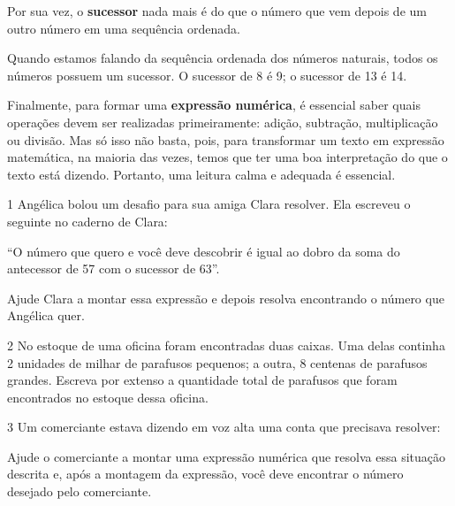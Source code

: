 {{Por sua vez, o \textbf{sucessor} nada mais é do que o número que
vem depois de um outro número em uma sequência ordenada.

Quando estamos falando da sequência ordenada dos números naturais, todos
os números possuem um sucessor. O sucessor de 8 é 9; o sucessor 
de 13 é 14.

Finalmente, para formar uma \textbf{expressão numérica},
é essencial saber quais operações devem ser realizadas primeiramente:
adição, subtração, multiplicação ou divisão. Mas só isso não basta, 
pois, para transformar um texto em expressão matemática, na maioria 
das vezes, temos que ter uma boa interpretação do que o texto está
dizendo. Portanto, uma leitura calma e adequada é essencial.}


\num{1} Angélica bolou um desafio para sua amiga Clara
resolver. Ela escreveu o seguinte no caderno de Clara:

``O número que quero e você deve descobrir é igual ao dobro da soma do
antecessor de 57 com o sucessor de 63''.


Ajude Clara a montar essa expressão e depois resolva encontrando o
número que Angélica quer.



\num{2} No estoque de uma oficina foram encontradas duas caixas.
Uma delas continha 2 unidades de milhar de parafusos pequenos; a outra, 8
centenas de parafusos grandes. Escreva por extenso a quantidade total de
parafusos que foram encontrados no estoque dessa oficina.



\num{3} Um comerciante estava dizendo em voz alta uma conta que precisava
resolver:


Ajude o comerciante a montar uma expressão numérica que resolva
essa situação descrita e, após a montagem da expressão, você deve
encontrar o número desejado pelo comerciante.

}
